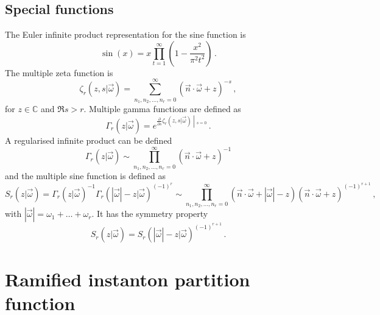 \documentclass[main.tex]{subfiles}
\begin{document}
\begin{subappendices}
\subsection{Special functions}
The Euler infinite product representation for the sine function is
\begin{equation}\label{eqn:Eulersine}
\sin(x)=x\prod_{t=1}^{\infty}\left(1-\frac{x^2}{\pi^2t^2}\right)\,.
\end{equation}
The multiple zeta function is 
\begin{equation}
\zeta_r(z,s|\vec{\omega})=\sum_{n_1,n_2,\dots,n_r=0}^{\infty}(\vec{n}\cdot\vec{\omega}+z)^{-s}\,,
\end{equation}
for $z\in\mathbb{C}$ and $\Re s>r$. Multiple gamma functions are defined as
\begin{equation}
\Gamma_r(z|\vec{\omega})=e^{\left.\frac{\partial}{\partial s}\zeta_r(z,s|\vec{\omega})\middle|_{s=0}\right.}\,.
\end{equation}
A regularised infinite product can be defined 
\begin{equation}\label{eqn:multigamma}
\Gamma_r(z|\vec{\omega})\sim\prod_{n_1,n_2,\dots,n_r=0}^{\infty}(\vec{n}\cdot\vec{\omega}+z)^{-1}
\end{equation}
and the multiple sine function is defined as
\begin{equation}\label{eqn:multisine}
S_r(z|\vec{\omega})=\Gamma_r(z|\vec{\omega})^{-1}\Gamma_r(|\vec{\omega}|-z|\vec{\omega})^{(-1)^r}\sim \prod_{n_1,n_2,\dots,n_r=0}^{\infty}\left(\vec{n}\cdot\vec{\omega}+|\vec{\omega}|-z\right)\left(\vec{n}\cdot\vec{\omega}+z\right)^{(-1)^{r+1}}\,,
\end{equation} 
with $|\vec{\omega}|=\omega_1+\dots+\omega_r$. It has the symmetry property
\begin{equation}
S_r(z|\vec{\omega})=S_r(|\vec{\omega}|-z|\vec{\omega})^{(-1)^{r+1}}\,.
\end{equation}
\section{Ramified instanton partition function}


\end{subappendices}
\end{document}
